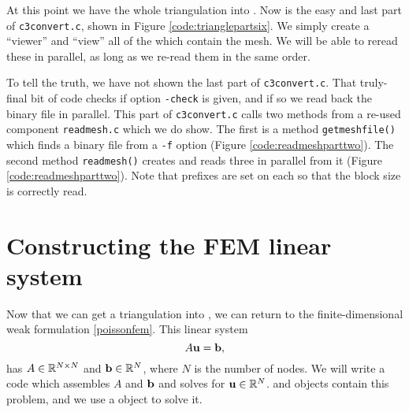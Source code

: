 
At this point we have the whole triangulation into \PETSc \pVecs.  Now is the easy and last part of \texttt{c3convert.c}, shown in Figure \ref{code:trianglepartsix}.  We simply create a \PETSc ``viewer'' and ``view'' all of the \pVecs which contain the mesh.  We will be able to reread these \pVecs in parallel, as long as we re-read them in the same order.


To tell the truth, we have not shown the last part of \texttt{c3convert.c}.  That truly-final bit of code checks if option \texttt{-check} is given, and if so we read back the binary file in parallel.  This part of \texttt{c3convert.c} calls two methods from a re-used component \texttt{readmesh.c} which we do show.  The first is a method \texttt{getmeshfile()} which finds a \PETSc binary file from a \texttt{-f} option (Figure \ref{code:readmeshparttwo}).  The second method \texttt{readmesh()} creates and reads three \pVecs in parallel from it (Figure \ref{code:readmeshparttwo}).  Note that prefixes are set on each \pVec so that the block size is correctly read.




\section{Constructing the FEM linear system}

Now that we can get a triangulation into \PETSc, we can return to the finite-dimensional weak formulation \eqref{poissonfem}.  This linear system
\begin{equation}
A \mathbf{u} = \mathbf{b}, \label{poissonmatrix}
\end{equation}
has $A\in\mathbb{R}^{N\times N}$ and $\mathbf{b}\in\mathbb{R}^N$, where $N$ is the number of nodes.  We will write a code which assembles $A$ and $\mathbf{b}$ and solves for $\mathbf{u}\in\mathbb{R}^N$.  \PETSc \pMat and \pVec objects contain this problem, and we use a \PETSc \pKSP object to solve it.

